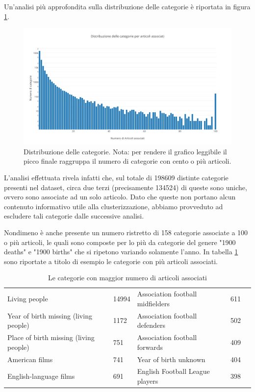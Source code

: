\documentclass[
	12pt, %
	a4paper, %
	oneside, %
	headinclude,footinclude, %
	BCOR5mm, %
]{scrartcl}
\begin{document}
    Un'analisi più approfondita sulla distribuzione delle categorie è riportata in figura \ref{fig:categories}. 
    \begin{figure}[!htb]
			\centering
			\includegraphics[scale=.5]{Figures/categories.png}
			\caption{Distribuzione delle categorie. Nota: per rendere il grafico leggibile il picco finale raggruppa il numero di categorie con cento o più articoli.}
			\label{fig:categories}
		\end{figure}
   
	L'analisi effettuata rivela infatti che, sul totale di 198609 distinte categorie presenti nel dataset, circa due terzi (precisamente 134524) di queste sono uniche, ovvero sono associate ad un solo articolo.
	Dato che queste non portano alcun contenuto informativo utile alla clusterizzazione, abbiamo provveduto ad escludere tali categorie dalle successive analisi.

	Nondimeno è anche presente un numero ristretto di 158 categorie associate a 100 o più articoli, le quali sono composte per lo più da categorie del genere "1900 deaths" e "1900 births" che si ripetono variando solamente l'anno.
	In tabella \ref{table:toptencategories} sono riportate a titolo di esempio le categorie con più articoli associati.


	\begin{table}[]
	\centering
	\caption{Le categorie con maggior numero di articoli associati}
	\label{table:toptencategories}
	\begin{tabular}{l|l|l|l|l}
	Living people & 14994 & Association football midfielders & 611 \\
	Year of birth missing (living people) & 1172 & Association football defenders & 502 \\
	Place of birth missing (living people) & 751 & Association football forwards & 409 \\
	American films & 741 & Year of birth unknown & 404 \\
	English-language films & 691 & English Football League players & 398 \\
	\end{tabular}
	\end{table}
\end{document}
